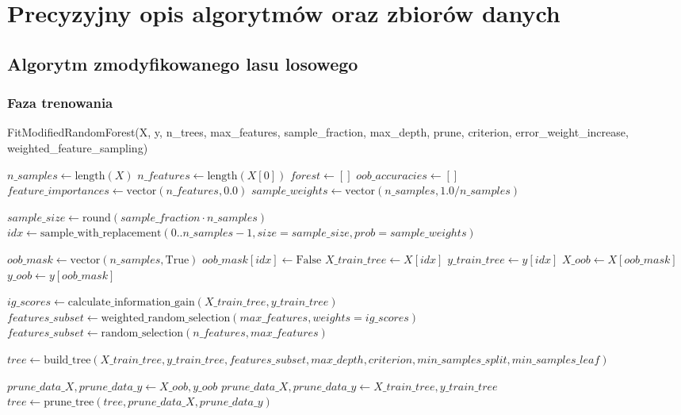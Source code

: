 \documentclass[11pt,a4paper]{article}
\begin{document}
\section{Precyzyjny opis algorytmów oraz zbiorów danych}

\subsection{Algorytm zmodyfikowanego lasu losowego}

\subsubsection{Faza trenowania}

\begin{algorithm}
\caption{FitModifiedRandomForest(X, y, n\_trees, max\_features, sample\_fraction, max\_depth, prune, criterion, error\_weight\_increase, weighted\_feature\_sampling)}
\begin{algorithmic}[1]
\State $n\_samples \gets \text{length}(X)$
\State $n\_features \gets \text{length}(X[0])$
\State $forest \gets []$
\State $oob\_accuracies \gets []$
\State $feature\_importances \gets \text{vector}(n\_features, 0.0)$
\State $sample\_weights \gets \text{vector}(n\_samples, 1.0 / n\_samples)$

    \State $sample\_size \gets \text{round}(sample\_fraction \cdot n\_samples)$
    \State $idx \gets \text{sample\_with\_replacement}(0..n\_samples-1, size=sample\_size, prob=sample\_weights)$

    \State $oob\_mask \gets \text{vector}(n\_samples, \text{True})$
    \State $oob\_mask[idx] \gets \text{False}$
    \State $X\_train\_tree \gets X[idx]$
    \State $y\_train\_tree \gets y[idx]$
    \State $X\_oob \gets X[oob\_mask]$
    \State $y\_oob \gets y[oob\_mask]$

        \State $ig\_scores \gets \text{calculate\_information\_gain}(X\_train\_tree, y\_train\_tree)$
        \State $features\_subset \gets \text{weighted\_random\_selection}(max\_features, weights=ig\_scores)$
    \Else
        \State $features\_subset \gets \text{random\_selection}(n\_features, max\_features)$
    \EndIf

    \State $tree \gets \text{build\_tree}(X\_train\_tree, y\_train\_tree, features\_subset, max\_depth, criterion, min\_samples\_split, min\_samples\_leaf)$

            \State $prune\_data\_X, prune\_data\_y \gets X\_oob, y\_oob$
        \Else
            \State $prune\_data\_X, prune\_data\_y \gets X\_train\_tree, y\_train\_tree$
        \EndIf
        \State $tree \gets \text{prune\_tree}(tree, prune\_data\_X, prune\_data\_y)$
    \EndIf


\end{algorithmic}
\end{algorithm}
\end{document}
